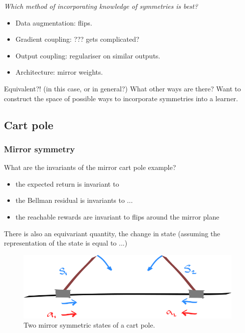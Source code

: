 \begin{displayquote}
\textit{Which method of incorporating knowledge of symmetries is best?}
\end{displayquote}

\begin{itemize}
\tightlist
  \item Data augmentation: flips.
  \item Gradient coupling: ??? gets complicated?
  \item Output coupling: regulariser on similar outputs.
  \item Architecture: mirror weights.
\end{itemize}

Equivalent?! (in this case, or in general?)
What other ways are there? Want to construct the space of possible ways to incorporate symmetries into a learner.


\subsection{Cart pole} \label{game-invariants}

\subsubsection{Mirror symmetry}

What are the invariants of the mirror cart pole example?

\begin{itemize}
	\tightlist
	\item the expected return is invariant to
	\item the Bellman residual is invariants to ...
	\item the reachable rewards are invariant to flips around the mirror plane
\end{itemize}
There is also an equivariant quantity, the change in state (assuming the representation of the state is equal to ...)


\begin{figure}[h!]
	\centering
	\includegraphics[width=1\textwidth,height=0.25\textheight]{../../pictures/drawings/cart-pole-mirror.png}
	\caption{Two mirror symmetric states of a cart pole.}
\end{figure}

